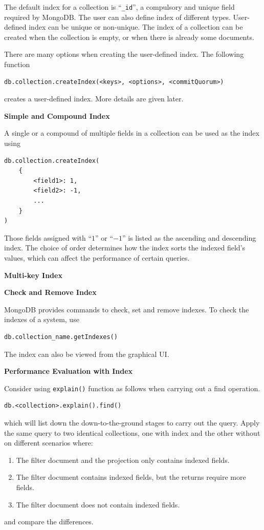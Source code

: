The default index for a collection is ``\verb|_id|'', a compulsory and unique field required by MongoDB. The user can also define index of different types. User-defined index can be unique or non-unique. The index of a collection can be created when the collection is empty, or when there is already some documents.

There are many options when creating the user-defined index. The following function 
\begin{lstlisting}
db.collection.createIndex(<keys>, <options>, <commitQuorum>)
\end{lstlisting}
creates a user-defined index. More details are given later.

\vspace{0.1in}
\noindent \textbf{Simple and Compound Index}
\vspace{0.1in}

A single or a compound of multiple fields in a collection can be used as the index using
\begin{lstlisting}
db.collection.createIndex(
	{
		<field1>: 1,
		<field2>: -1,
		...
	}
)
\end{lstlisting}
Those fields assigned with ``$1$'' or ``$-1$'' is listed as the ascending and descending index. The choice of order determines how the index sorts the indexed field's values, which can affect the performance of certain queries. 

\vspace{0.1in}
\noindent \textbf{Multi-key Index}
\vspace{0.1in}



\vspace{0.1in}
\noindent \textbf{Check and Remove Index}
\vspace{0.1in}

MongoDB provides commands to check, set and remove indexes. To check the indexes of a system, use
\begin{lstlisting}
db.collection_name.getIndexes()
\end{lstlisting}
The index can also be viewed from the graphical UI.

\vspace{0.1in}
\noindent \textbf{Performance Evaluation with Index}
\vspace{0.1in}

Consider using \verb|explain()| function as follows when carrying out a find operation.
\begin{lstlisting}
db.<collection>.explain().find()
\end{lstlisting}
which will list down the down-to-the-ground stages to carry out the query. Apply the same query to two identical collections, one with index and the other without on different scenarios where:
\begin{enumerate}
	\item The filter document and the projection only contains indexed fields.
	\item The filter document contains indexed fields, but the returns require more fields.
	\item The filter document does not contain indexed fields.
\end{enumerate}
and compare the differences.

